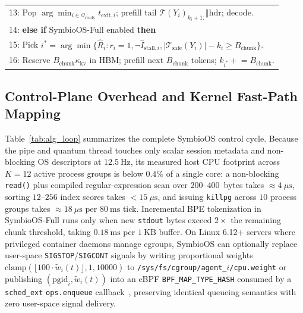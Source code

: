 \documentclass[10pt,journal,compsoc]{IEEEtran}
\theoremstyle{definition}
\theoremstyle{remark}
\newcommand{\SymbioOS}{\textup{\textsc{SymbioOS}}}
\newcommand{\SymbioFull}{\textup{\textsc{SymbioOS-Full}}}
\def\SymbioOS{SymbioOS}%
\def\SymbioFull{SymbioOS-Full}%
\begin{document}
\begin{table}[!t]
\begin{tabular}{p{}}
13: \hspace{1.2em}Pop $\arg\min_{i \in \mathcal{Q}_{\mathrm{ready}}} t_{\mathrm{exit},i}$; prefill tail $\mathcal{T}(Y_i)_{k_i+1:} \Vert \text{hdr}$; decode. \\
14: \hspace{0.4em}\textbf{else if} \SymbioFull{} enabled \textbf{then} \\
15: \hspace{1.2em}Pick $i^* = \arg\min\{\hat{R}_i : r_i{=}1, \neg\hat{I}_{\mathrm{stall},i}, |\mathcal{T}_{\mathrm{safe}}(Y_i)| - k_i \ge B_{\mathrm{chunk}}\}$. \\
16: \hspace{1.2em}Reserve $B_{\mathrm{chunk}}\kappa_{\mathrm{kv}}$ in HBM; prefill next $B_{\mathrm{chunk}}$ tokens; $k_{i^*} \mathrel{+}= B_{\mathrm{chunk}}$. \\
\bottomrule
\end{tabular}
\end{table}

\subsection{Control-Plane Overhead and Kernel Fast-Path Mapping}
Table~\ref{tab:alg_loop} summarizes the complete \SymbioOS{} control cycle. Because the pipe and quantum thread touches only scalar session metadata and non-blocking OS descriptors at $12.5~\mathrm{Hz}$, its measured host CPU footprint across $K = 12$ active process groups is below $0.4\%$ of a single core: a non-blocking \texttt{read()} plus compiled regular-expression scan over $200$--$400$~bytes takes $\approx 4~\mu\mathrm{s}$, sorting $12$--$256$ index scores takes $< 15~\mu\mathrm{s}$, and issuing \texttt{killpg} across $10$ process groups takes $\approx 18~\mu\mathrm{s}$ per $80~\mathrm{ms}$ tick. Incremental BPE tokenization in \SymbioFull{} runs only when new \texttt{stdout} bytes exceed $2\times$ the remaining chunk threshold, taking $0.18~\mathrm{ms}$ per $1~\mathrm{KB}$ buffer. On Linux 6.12+ servers where privileged container daemons manage cgroups, \SymbioOS{} can optionally replace user-space \texttt{SIGSTOP}/\texttt{SIGCONT} signals by writing proportional weights $\mathrm{clamp}(\lfloor 100 \cdot \tilde{w}_i(t) \rfloor, 1, 10000)$ to \texttt{/sys/fs/cgroup/agent\_$i$/cpu.weight} or publishing $(\mathrm{pgid}_i, \tilde{w}_i(t))$ into an eBPF \texttt{BPF\_MAP\_TYPE\_HASH} consumed by a \texttt{sched\_ext} \texttt{ops.enqueue} callback~\cite{zheng2026agentcgroup}, preserving identical queueing semantics with zero user-space signal delivery.
\end{document}
